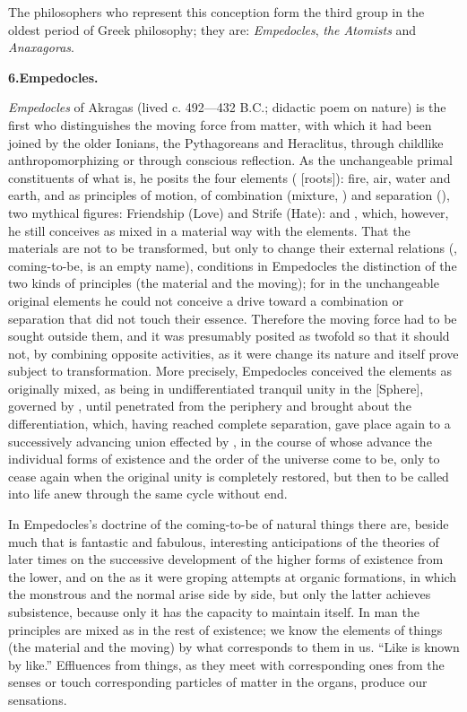 The philosophers who represent this conception form the third group in
the oldest period of Greek philosophy; they are: \emph{Empedocles},
\emph{the Atomists} and \emph{Anaxagoras}.

\divrule

\begin{center}
\textbf{6.\enspace Empedocles.}
\end{center}

\emph{Empedocles} of Akragas (lived c. 492---432 B.C.; didactic poem
on nature) is the first who distinguishes the moving force from matter,
with which it had been joined by the older Ionians, the Pythagoreans
and Heraclitus, through childlike anthropomorphizing or through
conscious reflection. As the unchangeable primal constituents of what
is, he posits the four elements ( [roots]): fire, air,
water and earth, and as principles of motion, of combination (mixture,
) and separation (), two mythical figures:
Friendship (Love) and Strife (Hate):  and ,
which, however, he still conceives as mixed in a material way with the
elements. That the materials are not to be transformed, but only to
change their external relations (, coming-to-be, is an empty
name), conditions in Empedocles the distinction of the two kinds of
principles (the material and the moving); for in the unchangeable
original elements he could not conceive a drive toward a combination or
separation that did not touch their essence. Therefore the moving force
had to be sought outside them, and it was presumably posited as twofold
so that it should not, by combining opposite activities, as it
were change its nature and itself prove subject to transformation. More
precisely, Empedocles conceived the elements as originally mixed, as
being in undifferentiated tranquil unity in the  [Sphere],
governed by , until  penetrated from the
periphery and brought about the differentiation, which, having reached
complete separation, gave place again to a successively advancing union
effected by , in the course of whose advance the individual
forms of existence and the order of the universe come to be, only to
cease again when the original unity is completely restored, but then to
be called into life anew through the same cycle without end.

In Empedocles's doctrine of the coming-to-be of natural things there
are, beside much that is fantastic and fabulous, interesting
anticipations of the theories of later times on the successive
development of the higher forms of existence from the lower, and on the
as it were groping attempts at organic formations, in which the
monstrous and the normal arise side by side, but only the latter
achieves subsistence, because only it has the capacity to maintain
itself. In man the principles are mixed as in the rest of existence; we
know the elements of things (the material and the moving) by what
corresponds to them in us. ``Like is known by like.'' Effluences from
things, as they meet with corresponding ones from the senses or touch
corresponding particles of matter in the organs, produce our
sensations.

